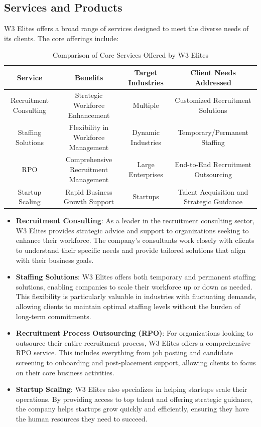 \subsection{Services and Products}

W3 Elites offers a broad range of services designed to meet the diverse needs of its clients. The core offerings include:

\begin{table}[h]
    \centering
    \caption{Comparison of Core Services Offered by W3 Elites}
    \begin{tabular}{|c|c|c|c|}
        \hline
        \textbf{Service} & \textbf{Benefits} & \textbf{Target Industries} & \textbf{Client Needs Addressed} \\
        \hline
        Recruitment Consulting & Strategic Workforce Enhancement & Multiple & Customized Recruitment Solutions \\
        \hline
        Staffing Solutions & Flexibility in Workforce Management & Dynamic Industries & Temporary/Permanent Staffing \\
        \hline
        RPO & Comprehensive Recruitment Management & Large Enterprises & End-to-End Recruitment Outsourcing \\
        \hline
        Startup Scaling & Rapid Business Growth Support & Startups & Talent Acquisition and Strategic Guidance \\
        \hline
    \end{tabular}
    \label{tab:core_services}
\end{table}

\begin{itemize}
    \item \textbf{Recruitment Consulting}: As a leader in the recruitment consulting sector, W3 Elites provides strategic advice and support to organizations seeking to enhance their workforce. The company’s consultants work closely with clients to understand their specific needs and provide tailored solutions that align with their business goals.
    \item \textbf{Staffing Solutions}: W3 Elites offers both temporary and permanent staffing solutions, enabling companies to scale their workforce up or down as needed. This flexibility is particularly valuable in industries with fluctuating demands, allowing clients to maintain optimal staffing levels without the burden of long-term commitments.
    \item \textbf{Recruitment Process Outsourcing (RPO)}: For organizations looking to outsource their entire recruitment process, W3 Elites offers a comprehensive RPO service. This includes everything from job posting and candidate screening to onboarding and post-placement support, allowing clients to focus on their core business activities.
    \item \textbf{Startup Scaling}: W3 Elites also specializes in helping startups scale their operations. By providing access to top talent and offering strategic guidance, the company helps startups grow quickly and efficiently, ensuring they have the human resources they need to succeed.

    
\end{itemize}




